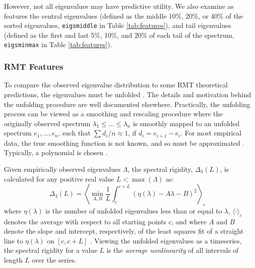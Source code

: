\documentclass[12pt]{spieman}  %
\newcommand{\code}[1]{\small\texttt{#1}\normalsize}
\begin{document}
\begin{spacing}{2}
However, not all eigenvalues may have predictive utility. We also examine as
features the central eigenvalues (defined as the middle 10\%, 20\%, or 40\% of
the sorted eigenvalues, \code{eigsmiddle} in Table \ref{tab:features}), and
tail eigenvalues (defined as the first and last 5\%,  10\%, and 20\% of each
tail of the spectrum, \code{eigsminmax} in Table \ref{tab:features}).


\subsubsection{RMT Features}
\label{sec:rmt-features}


To compare the observed eigenvalue distribution to some RMT theoretical
predictions, the eigenvalues must be unfolded
\cite{guhrRandommatrixTheoriesQuantum1998a,mehtaRandomMatrices2004}. The
details and motivation behind the unfolding procedure are well documented
elsewhere\cite{guhrRandommatrixTheoriesQuantum1998a}. Practically, the
unfolding process can be viewed as a smoothing and rescaling procedure where
the originally observed spectrum \(\lambda_1 \le \dots \le \lambda_n\) is
smoothly mapped to an unfolded spectrum \(e_1, \dots, e_n\), such that \(\sum
d_i/n \approx 1\), if \(d_i = e_{i+1} - e_i \). For most empirical data, the
true smoothing function is not known, and so must be approximated
\cite{guhrRandommatrixTheoriesQuantum1998a,mehtaRandomMatrices2004}. Typically,
a polynomial is chosen \cite{abul-magdUnfoldingSpectrumChaotic2014}.

Given empirically observed eigenvalues \(\Lambda\), the spectral rigidity,
\(\Delta_3(L)\), is calculated for any positive real value \(L <
\max(\Lambda)\) as:
\begin{equation}
\label{eq:rigidity}
\Delta_3(L) = \left \langle \min_{A,B} \frac{1}{L} \int_c^{c+L} \left(  \eta(\lambda) -A \lambda - B \right)^2 \right \rangle_c
\end{equation}
where \(\eta(\lambda)\) is the number of unfolded eigenvalues less than or
equal to \(\lambda\), \(\langle \cdot \rangle_c\) denotes the average with
respect to all starting points \(c\), and where \(A\) and \(B\) denote the
slope and intercept, respectively, of the least squares fit of a straight line
to \(\eta(\lambda)\) on \([c, c+L]\)
\cite{guhrRandommatrixTheoriesQuantum1998a}. Viewing the unfolded eigenvalues
as a timeseries, the spectral rigidity for a value \(L\) is the
\textit{average nonlinearity} of all intervals of length \(L\) over the series.



\end{spacing}
\end{document}
